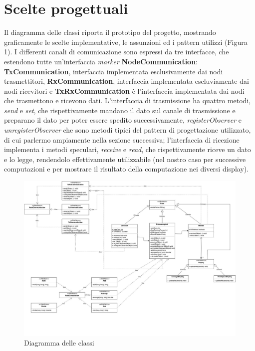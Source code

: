\documentclass[a4paper,10pt]{article}
\begin{document}
\section{Scelte progettuali}
Il diagramma delle classi riporta il prototipo del progetto, mostrando graficamente le scelte implementative, le assunzioni ed i pattern utilizzi (Figura 1). I differenti canali di comunicazione sono espressi da tre interfacce, che estendono tutte un'interfaccia \textit{marker} \textbf{NodeCommunication}:  \textbf{TxCommunication}, interfaccia implementata esclusivamente dai nodi trasmettitori, \textbf{RxCommunication}, interfaccia implementata escluviamente dai nodi ricevitori e \textbf{TxRxCommunication} è l'interfaccia implementata dai nodi che trasmettono e ricevono dati. L'interfaccia di trasmissione ha quattro metodi, \textit{send} e \textit{set}, che rispettivamente mandano il dato sul canale di trasmissione e preparano il dato per poter essere spedito successivamente, \textit{registerObserver} e \textit{unregisterObserver} che sono metodi tipici del pattern di progettazione utilizzato, di cui parlermo ampiamente nella sezione successiva; l'interfaccia di ricezione implementa i metodi speculari, \textit{receive} e \textit{read}, che rispettivamente riceve un dato e lo legge, rendendolo effettivamente utilizzabile (nel nostro caso per successive computazioni e per mostrare il risultato della computazione nei diversi display).

\begin{figure}[htbp]
\includegraphics[scale=0.24]{class_diagram.jpg}
\caption{Diagramma delle classi}
\label{class_dig}
\end{figure}
\end{document}

